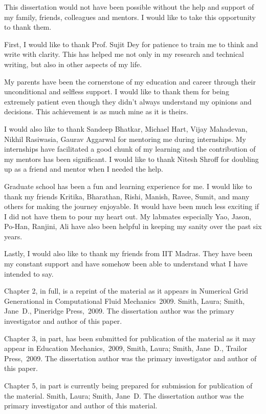 \documentclass[12pt]{ucsddissertation}
\begin{document}
\begin{acknowledgements}


This dissertation would not have been possible without the help and support of my family, friends, colleagues and mentors. I would like to take this opportunity to thank them. 


First, I would like to thank Prof. Sujit Dey for patience to train me to think and write with clarity. This has helped me not only in my research and technical writing, but also in other aspects of my life. 

My parents have been the cornerstone of my education and career through their unconditional and selfless support. I would like to thank them for being extremely patient even though they didn’t always understand my opinions and decisions. This achievement is as much mine as it is theirs. 

I would also like to thank Sandeep Bhatkar, Michael Hart, Vijay Mahadevan, Nikhil Rasiwasia, Gaurav Aggarwal for mentoring me during internships. My internships have facilitated a good chunk of my learning and the contribution of my mentors has been significant. I would like to thank Nitesh Shroff for doubling up as a friend and mentor when I needed the help. 

Graduate school has been a fun and learning experience for me. I would like to thank my friends Kritika, Bharathan, Rishi, Manish, Ravee, Sumit, and many others for making the journey enjoyable. It would have been much less exciting if I did not have them to pour my heart out. My labmates especially Yao, Jason, Po-Han, Ranjini, Ali have also been helpful in keeping my sanity over the past six years.  

Lastly, I would also like to thank my friends from IIT Madras. They have been my constant support and have somehow been able to understand what I have intended to say. 

Chapter 2, in full, is a reprint of the material as it appears in
Numerical Grid Generational in Computational Fluid Mechanics~2009.
Smith, Laura; Smith, Jane~D., Pineridge Press,~2009. The dissertation
author was the primary investigator and author of this paper.

Chapter 3, in part, has been submitted for publication of the material
as it may appear in Education Mechanics,~2009, Smith, Laura; Smith,
Jane~D., Trailor Press,~2009. The dissertation author was the primary
investigator and author of this paper.

Chapter 5, in part is currently being prepared for submission for
publication of the material. Smith, Laura; Smith, Jane~D\@. The
dissertation author was the primary investigator and author of this
material.
\end{acknowledgements}
\end{document}
